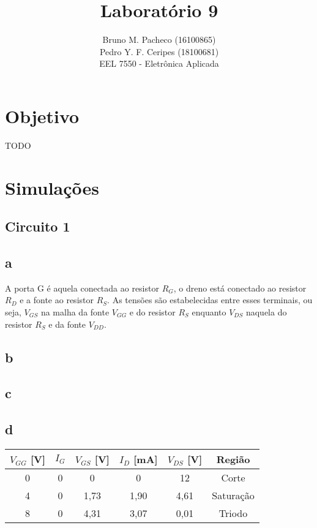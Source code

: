 \documentclass[a4paper]{report}
\begin{document}
 
\title{Laboratório 9}
\author{Bruno M. Pacheco (16100865)\\
Pedro Y. F. Ceripes (18100681) \\
EEL 7550 - Eletrônica Aplicada}

\maketitle
\section*{Objetivo}

TODO

\section*{Simulações}

\subsection*{Circuito 1}
\subsection*{a}

A porta G é aquela conectada ao resistor $R_G$, o dreno está conectado ao resistor $R_D$ e a fonte ao resistor $R_S$. As tensões são estabelecidas entre esses terminais, ou seja, $V_{GS}$ na malha da fonte $V_{GG}$ e do resistor $R_S$ enquanto $V_{DS}$ naquela do resistor $R_S$ e da fonte $V_{DD}$.

\subsection*{b}
\subsection*{c}
\subsection*{d}

\begin{table}[H]
    \centering
    \begin{tabular}{c | c | c | c | c | c}
	$V_{GG}$ [V]  & $I_G$ & $V_{GS}$ [V]  & $I_D$ [mA]  & $V_{DS}$ [V]  & Região \\
    \hline
    0 & 0 & 0 & 0 & 12 & Corte \\
    4 & 0 & 1,73 & 1,90 & 4,61 & Saturação \\
    8 & 0 & 4,31 & 3,07 & 0,01 & Triodo
    \end{tabular}
\end{table}
\end{document}
